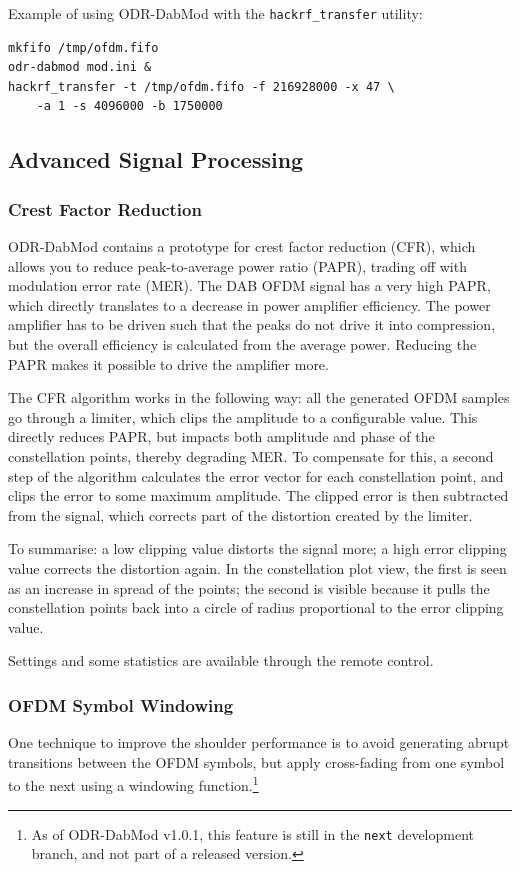 Example of using ODR-DabMod with the \texttt{hackrf\_transfer} utility:

\begin{lstlisting}
mkfifo /tmp/ofdm.fifo
odr-dabmod mod.ini &
hackrf_transfer -t /tmp/ofdm.fifo -f 216928000 -x 47 \
    -a 1 -s 4096000 -b 1750000
\end{lstlisting}


\subsection{Advanced Signal Processing}
\subsubsection{Crest Factor Reduction}
ODR-DabMod contains a prototype for crest factor reduction (CFR), which allows you to
reduce peak-to-average power ratio (PAPR), trading off with modulation error
rate (MER). The DAB OFDM signal has a very high PAPR, which directly translates
to a decrease in power amplifier efficiency. The power amplifier has to be
driven such that the peaks do not drive it into compression, but the overall
efficiency is calculated from the average power.
Reducing the PAPR makes it possible to drive the amplifier more.

The CFR algorithm works in the following way: all the generated OFDM samples go
through a limiter, which clips the amplitude to a configurable value. This
directly reduces PAPR, but impacts both amplitude and phase of the constellation
points, thereby degrading MER. To compensate for this, a second step of the
algorithm calculates the error vector for each constellation point, and clips
the error to some maximum amplitude. The clipped error is then subtracted from
the signal, which corrects part of the distortion created by the limiter.

To summarise: a low clipping value distorts the signal more; a high error
clipping value corrects the distortion again.
In the constellation plot view, the first is seen as an increase in spread of
the points; the second is visible because it pulls the constellation points back
into a circle of radius proportional to the error clipping value.

Settings and some statistics are available through the remote control.

\subsubsection{OFDM Symbol Windowing}
One technique to improve the shoulder performance is to avoid generating abrupt
transitions between the OFDM symbols, but apply cross-fading from one symbol to
the next using a windowing function.\footnote{As of ODR-DabMod v1.0.1, this feature is
still in the \texttt{next} development branch, and not part of a released
version.}


